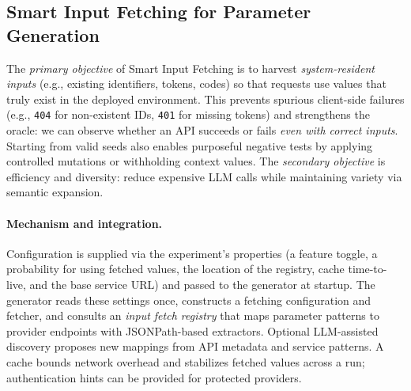 \documentclass[conference]{IEEEtran}
\begin{document}
\subsection{Smart Input Fetching for Parameter Generation}\label{ssec:smartfetch}

The \emph{primary objective} of Smart Input Fetching is to harvest \emph{system-resident inputs} (e.g., existing identifiers, tokens, codes) so that requests use values that truly exist in the deployed environment. This prevents spurious client-side failures (e.g., \texttt{404} for non-existent IDs, \texttt{401} for missing tokens) and strengthens the oracle: we can observe whether an API succeeds or fails \emph{even with correct inputs}. Starting from valid seeds also enables purposeful negative tests by applying controlled mutations or withholding context values. The \emph{secondary objective} is efficiency and diversity: reduce expensive LLM calls while maintaining variety via semantic expansion.

\paragraph{Mechanism and integration.}
Configuration is supplied via the experiment’s properties (a feature toggle, a probability for using fetched values, the location of the registry, cache time-to-live, and the base service URL) and passed to the generator at startup. The generator reads these settings once, constructs a fetching configuration and fetcher, and consults an \emph{input fetch registry} that maps parameter patterns to provider endpoints with JSONPath-based extractors. Optional LLM-assisted discovery proposes new mappings from API metadata and service patterns. A cache bounds network overhead and stabilizes fetched values across a run; authentication hints can be provided for protected providers.

\end{document}
